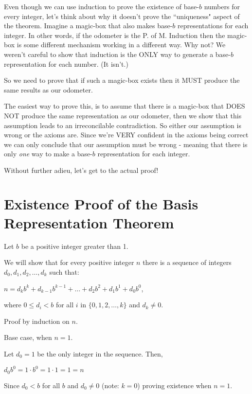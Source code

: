\documentclass{article}
\newenvironment{jprIn}{\begin{adjustwidth}{2em}{}}{\end{adjustwidth}}
\begin{document}
\bigskip
Even though we can use induction to prove the existence of base-$b$
numbers for every integer, let's think about why it
doesn't prove the ``uniqueness" aspect of 
the theorem.
Imagine a magic-box
that also makes base-$b$ representations for each
integer.
In other words, if the odometer is the P. of M. Induction then the magic-box
is some different mechanism working in a different way.
Why not? We weren't careful to show that induction is the ONLY way
to generate a base-$b$ representation for each number. (It isn't.)

So we need to prove that if such a magic-box exists then it MUST
produce the same results as our odometer.

The easiest way to prove this, is to assume that there is a magic-box
that DOES NOT produce the same representation as our odometer, then we show that
this assumption leads to an irreconcilable contradiction.
So either our assumption is wrong or the axioms are.
Since we're VERY confident in the axioms being correct we can only 
conclude that our assumption must be wrong - meaning
that there is only \emph{one} way 
to make a base-$b$ representation for each integer.

Without further adieu, let's get to the actual proof!

\section*{Existence Proof of the Basis Representation Theorem}
Let $b$ be a positive integer greater than 1.

We will show that for every positive integer $n$ there is a sequence
of integers $d_0, d_1, d_2,\dots{},d_k$ such that:

\hspace{3em}$n=d_kb^k+d_{k-1}b^{k-1}+\dots+d_2b^2+d_1b^1+d_0b^0$,

where $0\le{}d_i<b$ for all $i$ in $\{0,1,2,\dots{},k\}$ and $d_k\ne0$.


\bigskip
Proof by induction on $n$.

\bigskip
Base case, when $n=1$.

\begin{jprIn}
Let $d_0=1$ be the only integer in the sequence.  Then,

\hspace{3em}$d_0b^0=1\cdot{}b^0=1\cdot{}1=1=n$

Since $d_0<b$ for all $b$ and $d_0\ne0$ (note: $k=0$) proving existence when $n=1$.
\end{jprIn}
\end{document}
